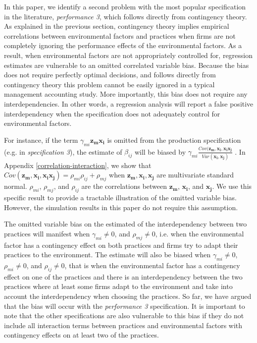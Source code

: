 \documentclass[12pt]{article}
\begin{document}
In this paper, we identify a second problem with the most popular specification in the literature, \emph{performance 3}, which follows directly from contingency theory. As explained in the previous section, contingency theory implies empirical correlations between environmental factors and practices when firms are not completely ignoring the performance effects of the environmental factors. As a result, when environmental factors are not appropriately controlled for, regression estimates are vulnerable to an omitted correlated variable bias. Because the bias does not require perfectly optimal decisions, and follows directly from contingency theory this problem cannot be easily ignored in a typical management accounting study. More importantly, this bias does not require any interdependencies. In other words, a regression analysis will report a false positive interdependency when the specification does not adequately control for environmental factors. 

For instance, if the term $\gamma_{mi} \mathbf{z_m} \mathbf{x_i}$ is omitted from the production specification (e.g. in \emph{specification 3}), the estimate of $\beta_{ij}$ will be biased by $\gamma_{mi} \frac{Cov(\mathbf{z_m}, \mathbf{x_i}, \mathbf{x_i} \mathbf{x_j}}{Var(\mathbf{x_i, x_j})}$ \citep{Chenhall2007}. In Appendix \ref{correlation-interaction}, we show that $Cov(\mathbf{z_m}, \mathbf{x_i}, \mathbf{x_i} \mathbf{x_j}) = \rho_{mi} \rho_{ij} + \rho_{mj}$ when $\mathbf{z_m}, \mathbf{x_i}, \mathbf{x_j}$ are multivariate standard normal. $\rho_{mi}$, $\rho_{mj}$, and $\rho_{ij}$ are the correlations between $\mathbf{z_m}$, $\mathbf{x_i}$, and $\mathbf{x_j}$. We use this specific result to provide a tractable illustration of the omitted variable bias. However, the simulation results in this paper do not require this assumption. 

The omitted variable bias on the estimated of the interdependency between two practices will manifest when $\gamma_{mi} \neq 0$, and $\rho_{mj} \neq 0$, i.e. when the environmental factor has a contingency effect on both practices and firms try to adapt their practices to the environment. The estimate will also be biased when $\gamma_{mi} \neq 0$, $\rho_{mi} \neq 0$, and $\rho_{ij} \neq 0$, that is when the environmental factor has a contingency effect on one of the practices and there is an interdependency between the two practices where at least some firms adapt to the environment and take into account the interdependency when choosing the practices. So far, we have argued that the bias will occur with the \emph{performance 3} specification. It is important to note that the other specifications are also vulnerable to this bias if they do not include all interaction terms between practices and environmental factors with contingency effects on at least two of the practices. 
\end{document}
